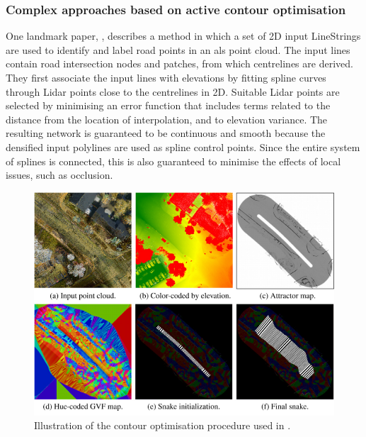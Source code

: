 \subsubsection{Complex approaches based on active contour optimisation}

One landmark paper, \cite{boyko_funkhauser_2011}, describes a method in which a set of 2D input LineStrings are used to identify and label road points in an \ac{als} point cloud. The input lines contain road intersection nodes and patches, from which centrelines are derived. They first associate the input lines with elevations by fitting spline curves through Lidar points close to the centrelines in 2D. Suitable Lidar points are selected by minimising an error function that includes terms related to the distance from the location of interpolation, and to elevation variance. The resulting network is guaranteed to be continuous and smooth because the densified input polylines are used as spline control points. Since the entire system of splines is connected, this is also guaranteed to minimise the effects of local issues, such as occlusion.

\begin{figure}
    \centering
    \includegraphics[width=0.85\linewidth]{final_report/figs/boyko_funkahuser_2011_01.png} 
    \caption{Illustration of the contour optimisation procedure used in \cite{boyko_funkhauser_2011}.}
    \label{fig:boykofunkhauser2011}
\end{figure}

